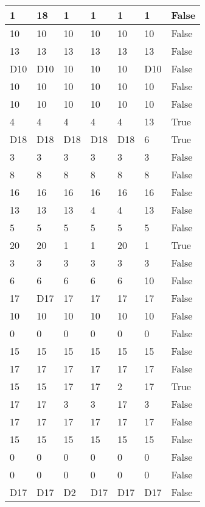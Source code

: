 \begin{longtable}[htbp]{| p{} | p{} | p{}| p{}| p{}| p{}| p{}|}
1 & 18 & 1 & 1 & 1 & 1 & False \\ \hline
10 & 10 & 10 & 10 & 10 & 10 & False \\ \hline
13 & 13 & 13 & 13 & 13 & 13 & False \\ \hline
\multicolumn{1}{|l|}{D10} & \multicolumn{1}{l|}{D10} & 10 & 10 & 10 & \multicolumn{1}{l|}{D10} & False \\ \hline
10 & 10 & 10 & 10 & 10 & 10 & False \\ \hline
10 & 10 & 10 & 10 & 10 & 10 & False \\ \hline
4 & 4 & 4 & 4 & 4 & 13 & True \\ \hline
\multicolumn{1}{|l|}{D18} & \multicolumn{1}{l|}{D18} & \multicolumn{1}{l|}{D18} & \multicolumn{1}{l|}{D18} & \multicolumn{1}{l|}{D18} & 6 & True \\ \hline
3 & 3 & 3 & 3 & 3 & 3 & False \\ \hline
8 & 8 & 8 & 8 & 8 & 8 & False \\ \hline
16 & 16 & 16 & 16 & 16 & 16 & False \\ \hline
13 & 13 & 13 & 4 & 4 & 13 & False \\ \hline
5 & 5 & 5 & 5 & 5 & 5 & False \\ \hline
20 & 20 & 1 & 1 & 20 & 1 & True \\ \hline
3 & 3 & 3 & 3 & 3 & 3 & False \\ \hline
6 & 6 & 6 & 6 & 6 & 10 & False \\ \hline
17 & \multicolumn{1}{l|}{D17} & 17 & 17 & 17 & 17 & False \\ \hline
10 & 10 & 10 & 10 & 10 & 10 & False \\ \hline
0 & 0 & 0 & 0 & 0 & 0 & False \\ \hline
15 & 15 & 15 & 15 & 15 & 15 & False \\ \hline
17 & 17 & 17 & 17 & 17 & 17 & False \\ \hline
15 & 15 & 17 & 17 & 2 & 17 & True \\ \hline
17 & 17 & 3 & 3 & 17 & 3 & False \\ \hline
17 & 17 & 17 & 17 & 17 & 17 & False \\ \hline
15 & 15 & 15 & 15 & 15 & 15 & False \\ \hline
0 & 0 & 0 & 0 & 0 & 0 & False \\ \hline
0 & 0 & 0 & 0 & 0 & 0 & False \\ \hline
\multicolumn{1}{|l|}{D17} & \multicolumn{1}{l|}{D17} & \multicolumn{1}{l|}{D2} & \multicolumn{1}{l|}{D17} & \multicolumn{1}{l|}{D17} & \multicolumn{1}{l|}{D17} & False \\ \hline

\end{longtable}
